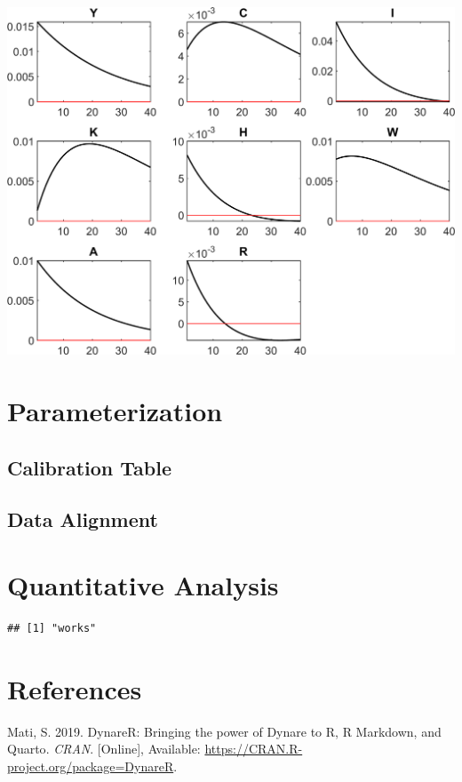 \documentclass[11pt,preprint]{elsarticle}
\let\origfigure\figure
\let\endorigfigure\endfigure
\renewenvironment{figure}[1][2] {
    \expandafter\origfigure\expandafter[H]
} {
    \endorigfigure
}
\numberwithin{equation}{section}
\numberwithin{figure}{section}
\numberwithin{table}{section}
\newlength{\cslhangindent}
\newenvironment{CSLReferences}[2] %
{\begin{list}{}{%
	\setlength{\itemindent}{0pt}
	\setlength{\leftmargin}{0pt}
	\setlength{\parsep}{0pt}
	\ifodd #1
	\setlength{\leftmargin}{\cslhangindent}
	\setlength{\itemindent}{-1\cslhangindent}
	\fi
	\setlength{\itemsep}{#2\baselineskip}}}
{\end{list}}
\begin{document}
\begin{figure}
\centering
\includegraphics{code/rbc_model/rbc_model/graphs/rbc_model_IRF_eps_cropped.png}
\caption{image}
\end{figure}

\section{Parameterization}\label{parameterization}

\subsection{Calibration Table}\label{calibration-table}

\subsection{Data Alignment}\label{data-alignment}

\section{Quantitative Analysis}\label{quantitative-analysis}

\begin{verbatim}
## [1] "works"
\end{verbatim}

\newpage

\section*{References}\label{references}

\label{refs}
\begin{CSLReferences}{1}{1}
Mati, S. 2019. DynareR: Bringing the power of {Dynare} to {R}, {R
Markdown}, and {Quarto}. \emph{CRAN}. {[}Online{]}, Available:
\url{https://CRAN.R-project.org/package=DynareR}.

\end{CSLReferences}


\end{document}
